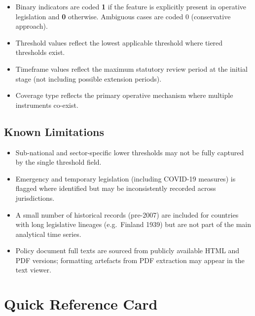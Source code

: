 \documentclass[12pt,a4paper]{article}
\begin{document}
\begin{itemize}
  \item Binary indicators are coded \textbf{1} if the feature is explicitly present in operative legislation and \textbf{0} otherwise. Ambiguous cases are coded 0 (conservative approach).
  \item Threshold values reflect the lowest applicable threshold where tiered thresholds exist.
  \item Timeframe values reflect the maximum statutory review period at the initial stage (not including possible extension periods).
  \item Coverage type reflects the primary operative mechanism where multiple instruments co-exist.
\end{itemize}

\subsection{Known Limitations}

\begin{itemize}
  \item Sub-national and sector-specific lower thresholds may not be fully captured by the single threshold field.
  \item Emergency and temporary legislation (including COVID-19 measures) is flagged where identified but may be inconsistently recorded across jurisdictions.
  \item A small number of historical records (pre-2007) are included for countries with long legislative lineages (e.g.\ Finland 1939) but are not part of the main analytical time series.
  \item Policy document full texts are sourced from publicly available HTML and PDF versions; formatting artefacts from PDF extraction may appear in the text viewer.
\end{itemize}

\section{Quick Reference Card}
\label{sec:quickref}
\end{document}
